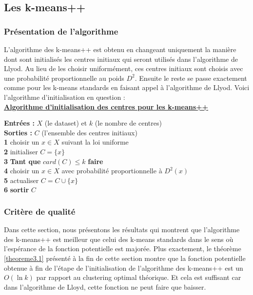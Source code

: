 \documentclass[12pt,a4paper]{book}
\newcommand{\1}{\mathds{1}}
\begin{document}

\subsection{Les k-means++}

\subsubsection{Présentation de l'algorithme}

L'algorithme des k-means++ est obtenu en changeant uniquement la manière dont sont initialisés les centres initiaux qui seront utilisés dans l'algorithme de Llyod. Au lieu de les choisir uniformément, ces centres initiaux sont choisis avec une probabilité proportionnelle au poids $D^2$. Ensuite le reste se passe exactement comme pour les k-means standards en faisant appel à l'algorithme de Llyod. Voici l'algorithme d'initialisation en question : \\

\noindent \textbf{\underline{Algorithme d'initialisation des centres pour les k-means++}}\label{algo_kmeans_pp}

\noindent \textbf{Entrées : } $X$ (le dataset) et $k$ (le nombre de centres)\\
\noindent \textbf{Sorties : } $C$ (l'ensemble des centres initiaux) \\
\textbf{1} choisir un $x \in X$ suivant la loi uniforme\\
\textbf{2} initialiser $C=\{x\}$\\
\textbf{3} \textbf{Tant que } $card(C) \leq k$ \textbf{faire}\\
\textbf{4} \indent choisir un $x \in X$ avec probabilité proportionnelle à $D^2(x)$\\
\textbf{5} \indent actualiser $C = C \cup \{x \}$\\
\textbf{6} \textbf{sortir} $C$ \\

\subsubsection{Critère de qualité}

Dans cette section, nous présentons les résultats qui montrent que l'algorithme des k-means++ est meilleur que celui des k-means standards dans le sens où l'espérance de la fonction potentielle est majorée. Plus exactement, le théorème \ref{theoreme3.1} présenté à la fin de cette section montre que la fonction potentielle obtenue à fin de l'étape de l'initialisation de l'algorithme des k-means++ est un $O(\ln k)$ par rapport au clustering optimal théorique. Et cela est suffisant car dans l'algorithme de Lloyd, cette fonction ne peut faire que baisser.
\end{document}

